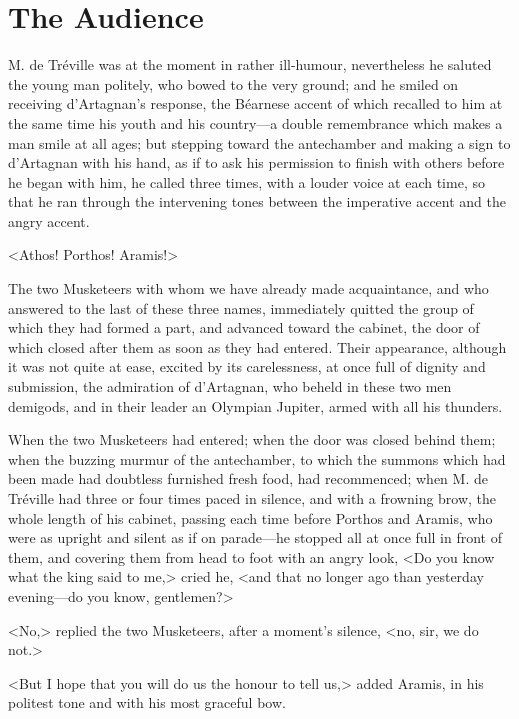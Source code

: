 
\chapter{The Audience} 
	
\lettrine[]{M}{.} de Tréville was at the moment in rather ill-humour, nevertheless he saluted the young man politely, who bowed to the very ground; and he smiled on receiving d'Artagnan's response, the Béarnese accent of which recalled to him at the same time his youth and his country---a double remembrance which makes a man smile at all ages; but stepping toward the antechamber and making a sign to d'Artagnan with his hand, as if to ask his permission to finish with others before he began with him, he called three times, with a louder voice at each time, so that he ran through the intervening tones between the imperative accent and the angry accent. 

<Athos! Porthos! Aramis!> 

The two Musketeers with whom we have already made acquaintance, and who answered to the last of these three names, immediately quitted the group of which they had formed a part, and advanced toward the cabinet, the door of which closed after them as soon as they had entered. Their appearance, although it was not quite at ease, excited by its carelessness, at once full of dignity and submission, the admiration of d'Artagnan, who beheld in these two men demigods, and in their leader an Olympian Jupiter, armed with all his thunders. 

When the two Musketeers had entered; when the door was closed behind them; when the buzzing murmur of the antechamber, to which the summons which had been made had doubtless furnished fresh food, had recommenced; when M. de Tréville had three or four times paced in silence, and with a frowning brow, the whole length of his cabinet, passing each time before Porthos and Aramis, who were as upright and silent as if on parade---he stopped all at once full in front of them, and covering them from head to foot with an angry look, <Do you know what the king said to me,> cried he, <and that no longer ago than yesterday evening---do you know, gentlemen?> 

<No,> replied the two Musketeers, after a moment's silence, <no, sir, we do not.> 

<But I hope that you will do us the honour to tell us,> added Aramis, in his politest tone and with his most graceful bow. 

